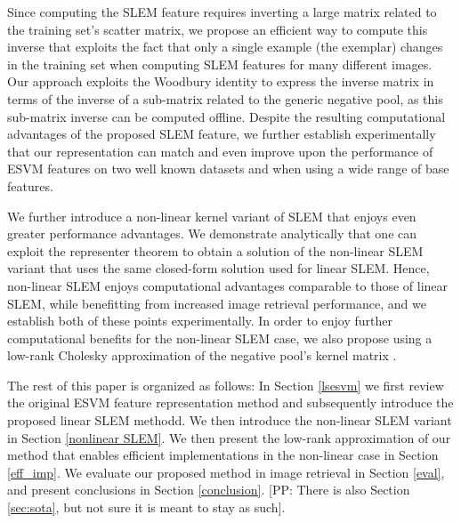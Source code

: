 Since computing the SLEM feature requires inverting a large matrix related to the training set's scatter matrix, we propose an efficient way to compute this inverse that exploits the fact that only a single example (the exemplar) changes in the training set when computing SLEM features for many different images. Our approach exploits the Woodbury identity to express the inverse matrix in terms of the inverse of a sub-matrix related to the generic negative pool, as this sub-matrix inverse can be computed offline. Despite the resulting computational advantages of the proposed SLEM feature, we further establish experimentally that our representation can match and even improve upon the performance of ESVM features on two well known datasets and when using a wide range of base features. 

We further introduce a non-linear kernel variant of SLEM that enjoys even greater performance advantages. We demonstrate analytically that one can exploit the representer theorem to obtain a solution of the non-linear SLEM variant that uses the same closed-form solution used for linear SLEM. Hence, non-linear SLEM enjoys computational advantages comparable to those of linear SLEM, while benefitting from increased image retrieval performance, and we establish both of these points experimentally. In order to enjoy further computational benefits for the non-linear SLEM case, we also propose using a low-rank Cholesky approximation of the negative pool's  kernel matrix \cite{BaJo05}.

The rest of this paper is organized as follows: 
In Section \ref{lsesvm} we first review the original ESVM feature representation method and subsequently introduce the proposed linear SLEM methodd. We then introduce the non-linear SLEM variant in Section \ref{nonlinear SLEM}. We then present the low-rank approximation of our method that enables efficient implementations in the non-linear case in  Section \ref{eff_imp}. We evaluate our proposed method in image retrieval in Section \ref{eval}, and present conclusions in Section \ref{conclusion}. {\color{red}[PP: There is also Section \ref{sec:sota}, but not sure it is meant to stay as such].}




